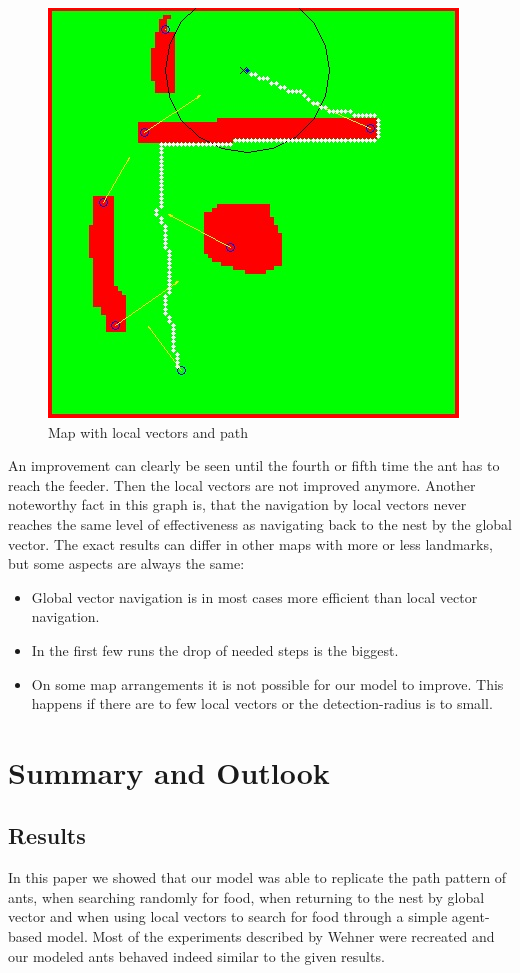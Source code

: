 \documentclass[11pt]{article}
\begin{document}
\begin{figure}[h!]
   \centering
   \includegraphics[scale=1]{images/loc.jpg}
   \caption[Map with local vectors and path]{Map with local vectors and path}
\label{}
\end{figure}
An improvement can clearly be seen until the fourth or fifth time the ant has to reach the feeder. Then the local vectors are not improved anymore. Another noteworthy fact in this graph is, that the navigation by local vectors never reaches the same level of effectiveness as navigating back to the nest by the global vector. The exact results can differ in other maps with more or less landmarks, but some aspects are always the same:
\begin{itemize}
\item Global vector navigation is in most cases more efficient than local vector navigation.
\item In the first few runs the drop of needed steps is the biggest.
\item On some map arrangements it is not possible for our model to improve. This happens if there are to few local vectors or the detection-radius is to small.
\end{itemize}

\newpage
\section{Summary and Outlook}
\subsection{Results}
In this paper we showed that our model was able to replicate the path pattern of ants, when searching randomly for food, when returning to the nest by global vector and when using local vectors to search for food through a simple agent-based model. Most of the experiments described by Wehner\cite{wehner03,wehner98} were recreated and our modeled ants behaved indeed similar to the given results.
\end{document}
